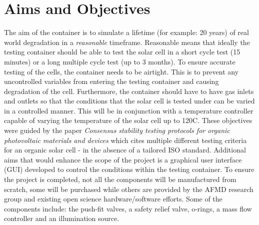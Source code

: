\documentclass[a4paper,11pt]{article}
\begin{document}
\section{Aims and Objectives}
The aim of the container is to simulate a lifetime (for example: 20 years) of real world degradation in a \emph{reasonable} timeframe. Reasonable means that ideally the testing container should be able to test the solar cell in a short cycle test (15 minutes) or a long multiple cycle test (up to 3 months). To ensure accurate testing of the cells, the container needs to be airtight. This is to prevent any uncontrolled variables from entering the testing container and causing degradation of the cell. Furthermore, the container should have to have gas inlets and outlets so that the conditions that the solar cell is tested under can be varied in a controlled manner. This will be in conjunction with a temperature controller capable of varying the temperature of the solar cell up to 120\textdegree C. These objectives were guided by the paper \emph{Consensus stability testing protocols for organic photovoltaic materials and devices} \cite[p.~1255-1261]{RN47} which cites multiple different testing criteria for an organic solar cell - in the absence of a tailored ISO standard. Additional aims that would enhance the scope of the project is a graphical user interface (GUI) developed to control the conditions within the testing container. To ensure the project is completed, not all the components will be manufactured from scratch, some will be purchased while others are provided by the AFMD research group and existing open science hardware/software efforts. Some of the components include: the push-fit valves, a safety relief valve, o-rings, a mass flow controller and an illumination source.
\end{document}
